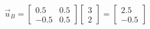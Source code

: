 \documentclass[preview]{standalone}
\begin{document}
\begin{align*}
\vec{u}_B = \begin{bmatrix} 0.5 & 0.5 \\ -0.5 & 0.5 \end{bmatrix} \begin{bmatrix} 3 \\ 2 \end{bmatrix} = \begin{bmatrix} 2.5 \\ -0.5 \end{bmatrix}
\end{align*}
\end{document}
